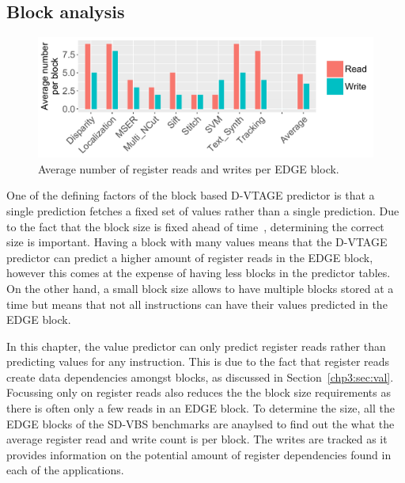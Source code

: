 
\subsection{Block analysis}


\begin{figure}[t]
    \centering
    \includegraphics[width=1\textwidth]{chapter3/graphics/averageRegRead.pdf}

    \caption{Average number of register reads and writes per EDGE block.}
    \label{fig:edge_reg_read}
	\vspace{1em}
\end{figure}

One of the defining factors of the block based D-VTAGE predictor is that a single prediction fetches a fixed set of values rather than a single prediction.
Due to the fact that the block size is fixed ahead of time~\cite{peraisBeBop2015}, determining the correct size is important.
Having a block with many values means that the D-VTAGE predictor can predict a higher amount of register reads in the EDGE block, however this comes at the expense of having less blocks in the predictor tables.
On the other hand, a small block size allows to have multiple blocks stored at a time but means that not all instructions can have their values predicted in the EDGE block.

In this chapter, the value predictor can only predict register reads rather than predicting values for any instruction.
This is due to the fact that register reads create data dependencies amongst blocks, as discussed in Section~\ref{chp3:sec:val}.
Focussing only on register reads also reduces the the block size requirements as there is often only a few reads in an EDGE block.
To determine the size, all the EDGE blocks of the SD-VBS benchmarks are anaylsed to find out the what the average register read and write count is per block.
The writes are tracked as it provides information on the potential amount of register dependencies found in each of the applications.

